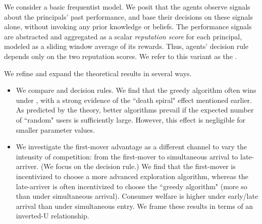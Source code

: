 We consider a basic frequentist model. We posit that the agents observe signals about the principals' past performance, and base their decisions on these signals alone, without invoking any prior knowledge or beliefs. The performance signals are abstracted and aggregated as a scalar \emph{reputation score} for each principal, modeled as a sliding window average of its rewards. Thus, agents' decision rule depends only on the two reputation scores. We refer to this variant as the \emph{\ExptsModel}.%

We refine and expand the theoretical results in several ways.

\begin{itemize}
\item We compare \HardMax and \HardMaxRandom decision rules. We find that the greedy algorithm often wins under \HardMax, with a strong evidence of the ``death spiral" effect mentioned earlier.
 As predicted by the theory, better algorithms prevail if the expected number of ``random" users is sufficiently large. However, this effect is negligible for smaller parameter values.


\item We investigate the first-mover advantage as a different channel to vary the intensity of competition: from the first-mover to simultaneous arrival to late-arriver. (We focus on the \HardMax decision rule.) We find that the first-mover is incentivized to choose a more advanced exploration algorithm, whereas the late-arriver is often incentivized to choose the ``greedy algorithm" (more so than under simultaneous arrival). Consumer welfare is higher under early/late arrival than under simultaneous entry. We frame these results in terms of an inverted-U relationship.




\end{itemize}
